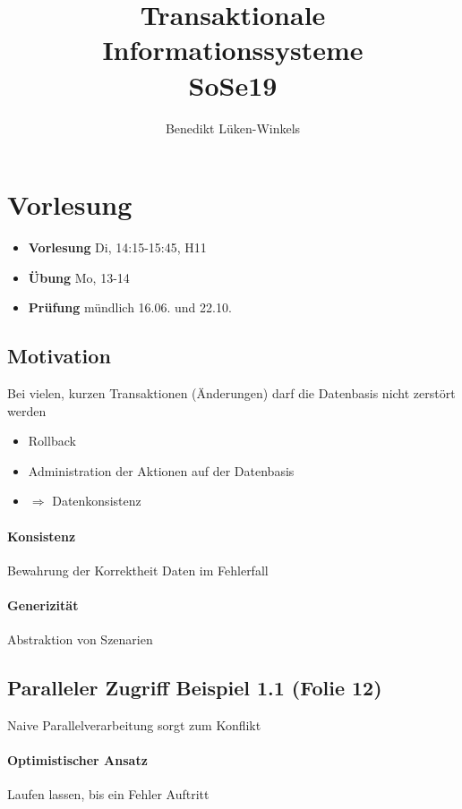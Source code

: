 \documentclass[ngerman]{scrartcl}
\title{Transaktionale Informationssysteme \\ SoSe19}
\author{Benedikt Lüken-Winkels}
\begin{document}
\maketitle
\tableofcontents
\newpage
\begin{abstract}
\end{abstract}

\section{Vorlesung}
	
\begin{itemize}
  \item \textbf{Vorlesung} Di, 14:15-15:45, H11
  \item \textbf{Übung} Mo, 13-14
  \item \textbf{Prüfung} mündlich 16.06. und 22.10.
\end{itemize}
\subsection*{Motivation}
Bei vielen, kurzen Transaktionen (Änderungen) darf die Datenbasis nicht zerstört werden
\begin{itemize}
  \item Rollback
  \item Administration der Aktionen auf der Datenbasis
  \item $\Rightarrow$ Datenkonsistenz
\end{itemize}
\paragraph*{Konsistenz}
Bewahrung der Korrektheit Daten im Fehlerfall

\paragraph*{Generizität}
Abstraktion von Szenarien

\subsection*{Paralleler Zugriff Beispiel 1.1 (Folie 12)}
Naive Parallelverarbeitung sorgt zum Konflikt

\paragraph*{Optimistischer Ansatz}
Laufen lassen, bis ein Fehler Auftritt
\end{document}
